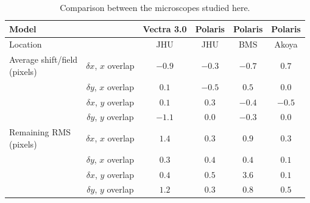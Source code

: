 \documentclass{article}
\begin{document}
\begin{table}[ht]
	\centering
	\begin{tabular}{|l|c|c|c|c|c|}
	\hline
	\multicolumn{2}{|l|}{Model} & Vectra 3.0 & Polaris & Polaris & Polaris \\\hline
	\multicolumn{2}{|l|}{Location} & JHU & JHU & BMS & Akoya \\\hline
	\multirowcell{3}[0pt][l]{Average shift/field \\ (pixels)}
	& $\delta x$, $x$ overlap & $-0.9$ & $-0.3$ & $-0.7$ & $0.7$ \\\cline{2-6}
	& $\delta y$, $x$ overlap & $0.1$ & $-0.5$ & $0.5$ & $0.0$ \\\cline{2-6}
	& $\delta x$, $y$ overlap & $0.1$ & $0.3$ & $-0.4$ & $-0.5$ \\\cline{2-6}
	& $\delta y$, $y$ overlap & $-1.1$ & $0.0$ & $-0.3$ & $0.0$ \\\hline
	\multirowcell{4}[0pt][l]{Remaining RMS\\(pixels)}
	& $\delta x$, $x$ overlap & $1.4$ & $0.3$ & $0.9$ & $0.3$ \\\cline{2-6}
	& $\delta y$, $x$ overlap & $0.3$ & $0.4$ & $0.4$ & $0.1$ \\\cline{2-6}
	& $\delta x$, $y$ overlap & $0.4$ & $0.5$ & $3.6$ & $0.1$ \\\cline{2-6}
	& $\delta y$, $y$ overlap & $1.2$ & $0.3$ & $0.8$ & $0.5$ \\\hline
	\end{tabular}
	\caption{Comparison between the microscopes studied here.}
	\label{table:microscopes}
\end{table}
\end{document}
